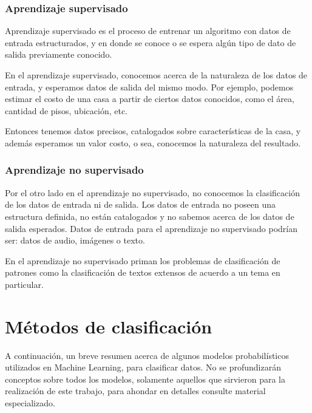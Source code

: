 \documentclass[a4paper,12pt,oneside,spanish]{book}
\begin{document}
\subsubsection{Aprendizaje supervisado}

Aprendizaje supervisado es el proceso de entrenar un algoritmo con datos de entrada estructurados, y en donde se conoce o se espera algún tipo de dato de salida previamente conocido. \par

En el aprendizaje supervisado, conocemos acerca de la naturaleza de los datos de entrada, y esperamos datos de salida del mismo modo. Por ejemplo, podemos estimar el costo de una casa a partir de ciertos datos conocidos, como el área, cantidad de pisos, ubicación, etc.  \par

Entonces tenemos datos precisos, catalogados sobre características de la casa, y además esperamos un valor costo, o sea, conocemos la naturaleza del resultado.\par

\subsubsection{Aprendizaje no supervisado}

Por el otro lado en el aprendizaje no supervisado, no conocemos la clasificación de los datos de entrada ni de salida. Los datos de entrada no poseen una estructura definida, no están catalogados y no sabemos acerca de los datos de salida esperados. Datos de entrada para el aprendizaje no supervisado podrían ser: datos de audio, imágenes o texto. \par

En el aprendizaje no supervisado priman los problemas de clasificación de patrones como la clasificación de textos extensos de acuerdo a un tema en particular.\par

\section{Métodos de clasificación}
A continuación, un breve resumen acerca de algunos modelos probabilísticos utilizados en Machine Learning, para clasificar datos. No se profundizarán conceptos sobre todos los modelos, solamente aquellos que sirvieron para la realización de este trabajo, para ahondar en detalles consulte material especializado.\par
\end{document}
